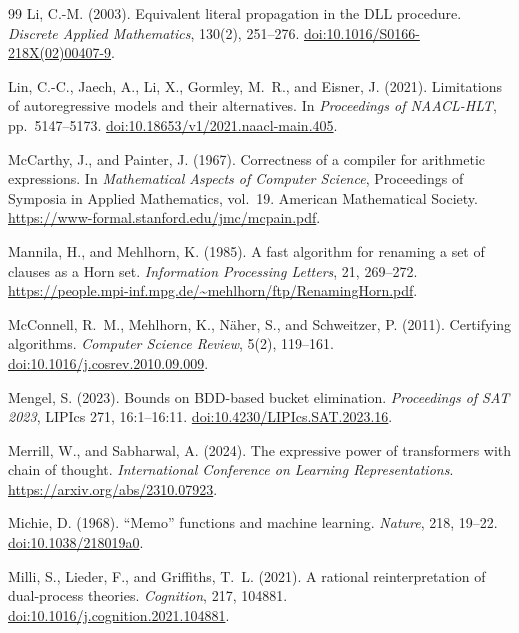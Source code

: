 \documentclass[11pt,a4paper]{article}
\numberwithin{equation}{section}
\theoremstyle{plain}
\theoremstyle{definition}
\theoremstyle{remark}
\begin{document}
\begin{thebibliography}{99}
Li, C.-M. (2003).
Equivalent literal propagation in the DLL procedure.
\emph{Discrete Applied Mathematics}, 130(2), 251--276.
\href{https://doi.org/10.1016/S0166-218X(02)00407-9}{doi:10.1016/S0166-218X(02)00407-9}.

Lin, C.-C., Jaech, A., Li, X., Gormley, M.~R., and Eisner, J. (2021).
Limitations of autoregressive models and their alternatives.
In \emph{Proceedings of NAACL-HLT}, pp.~5147--5173.
\href{https://doi.org/10.18653/v1/2021.naacl-main.405}{doi:10.18653/v1/2021.naacl-main.405}.

McCarthy, J., and Painter, J. (1967).
Correctness of a compiler for arithmetic expressions.
In \emph{Mathematical Aspects of Computer Science}, Proceedings of Symposia in Applied Mathematics, vol.~19.
American Mathematical Society.
\url{https://www-formal.stanford.edu/jmc/mcpain.pdf}.

Mannila, H., and Mehlhorn, K. (1985).
A fast algorithm for renaming a set of clauses as a Horn set.
\emph{Information Processing Letters}, 21, 269--272.
\url{https://people.mpi-inf.mpg.de/~mehlhorn/ftp/RenamingHorn.pdf}.

McConnell, R.~M., Mehlhorn, K., N\"aher, S., and Schweitzer, P. (2011).
Certifying algorithms.
\emph{Computer Science Review}, 5(2), 119--161.
\href{https://doi.org/10.1016/j.cosrev.2010.09.009}{doi:10.1016/j.cosrev.2010.09.009}.

Mengel, S. (2023).
Bounds on BDD-based bucket elimination.
\emph{Proceedings of SAT 2023}, LIPIcs 271, 16:1--16:11.
\href{https://doi.org/10.4230/LIPIcs.SAT.2023.16}{doi:10.4230/LIPIcs.SAT.2023.16}.

Merrill, W., and Sabharwal, A. (2024).
The expressive power of transformers with chain of thought.
\emph{International Conference on Learning Representations}.
\url{https://arxiv.org/abs/2310.07923}.

Michie, D. (1968).
``Memo'' functions and machine learning.
\emph{Nature}, 218, 19--22.
\href{https://doi.org/10.1038/218019a0}{doi:10.1038/218019a0}.

Milli, S., Lieder, F., and Griffiths, T.~L. (2021).
A rational reinterpretation of dual-process theories.
\emph{Cognition}, 217, 104881.
\href{https://doi.org/10.1016/j.cognition.2021.104881}{doi:10.1016/j.cognition.2021.104881}.


\end{thebibliography}
\end{document}
